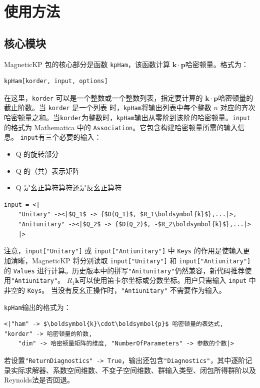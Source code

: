 \documentclass[titlepage,a4paper,12pt,AutoFakeBold]{article}
\begin{document}
\section{使用方法}
\subsection{核心模块}

\textsf{MagneticKP} 包的核心部分是函数 \lstinline!kpHam!，该函数计算 $\boldsymbol{k}\cdot\boldsymbol{p}$哈密顿量。格式为：
\begin{lstlisting}[backgroundcolor={\color{yellow!5!white}},mathescape=true]
	kpHam[korder, input, options]
\end{lstlisting}
在这里，\lstinline!korder! 可以是一个整数或一个整数列表，指定要计算的 
$\boldsymbol{k}\cdot\boldsymbol{p}$哈密顿量的截止阶数。当 \lstinline!korder! 是一个列表 
时，\lstinline!kpHam!将输出列表中每个整数 $n$ 对应的齐次哈密顿量之和。当\lstinline!korder!为整数时，\lstinline!kpHam!输出从零阶到该阶的哈密顿量。\lstinline!input! 的格式为 Mathematica 中的 \lstinline!Association!。它包含构建哈密顿量所需的输入信息。
\lstinline!input!有三个必要的输入：
\begin{itemize}
	\item Q 的旋转部分
	\item Q 的（共）表示矩阵
	\item Q 是幺正算符算符还是反幺正算符
\end{itemize}
\begin{lstlisting}[backgroundcolor={\color{yellow!5!white}},mathescape=true]
	input = <|
	"Unitary" -><|$Q_1$ -> {$D(Q_1)$, $R_1\boldsymbol{k}$},...|>,
	"Anitunitary" -><|$Q_2$ -> {$D(Q_2)$, -$R_2\boldsymbol{k}$},...|>
	|>
\end{lstlisting}
注意，\lstinline|input["Unitary"]| 或 \lstinline|input["Antiunitary"]| 中 \lstinline|Keys| 的作用是使输入更加清晰，\textsf{MagneticKP} 将分别读取 \lstinline|input["Unitary"]| 和 \lstinline|input["Antiunitary"]| 的 \lstinline|Values| 进行计算。历史版本中的拼写\lstinline|"Anitunitary"|仍然兼容，新代码推荐使用\lstinline|"Antiunitary"|。
$R_1\boldsymbol{k}$可以使用笛卡尔坐标或分数坐标。用户只需输入 \lstinline|input| 中非空的 \lstinline|Keys|。
当没有反幺正操作时，\lstinline!"Antiunitary"! 不需要作为输入。

\lstinline!kpHam!输出的格式为：
\begin{lstlisting}[backgroundcolor={\color{yellow!5!white}},mathescape=true]
	<|"ham" -> $\boldsymbol{k}\cdot\boldsymbol{p}$ 哈密顿量的表达式,  "korder" -> 哈密顿量的阶数,
	"dim" -> 哈密顿量矩阵的维度, "NumberOfParameters" -> 参数的个数|>
\end{lstlisting}
若设置\lstinline|"ReturnDiagnostics" -> True|，输出还包含\lstinline|"Diagnostics"|，其中逐阶记录实际求解器、系数空间维数、不变子空间维数、群输入类型、闭包所得群阶以及Reynolds法是否回退。
\end{document}
